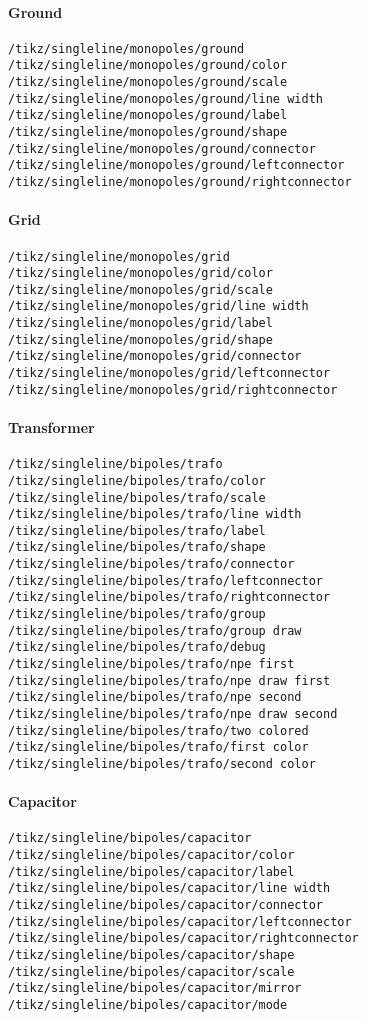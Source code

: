 \documentclass[a4]{article}
\begin{document}
\begin{footnotesize}
\paragraph{Ground}
\begin{verbatim}
/tikz/singleline/monopoles/ground
/tikz/singleline/monopoles/ground/color
/tikz/singleline/monopoles/ground/scale
/tikz/singleline/monopoles/ground/line width
/tikz/singleline/monopoles/ground/label
/tikz/singleline/monopoles/ground/shape
/tikz/singleline/monopoles/ground/connector
/tikz/singleline/monopoles/ground/leftconnector
/tikz/singleline/monopoles/ground/rightconnector
\end{verbatim}
\paragraph{Grid}
\begin{verbatim}
/tikz/singleline/monopoles/grid
/tikz/singleline/monopoles/grid/color
/tikz/singleline/monopoles/grid/scale
/tikz/singleline/monopoles/grid/line width
/tikz/singleline/monopoles/grid/label
/tikz/singleline/monopoles/grid/shape
/tikz/singleline/monopoles/grid/connector
/tikz/singleline/monopoles/grid/leftconnector
/tikz/singleline/monopoles/grid/rightconnector
\end{verbatim}
\paragraph{Transformer}
\begin{verbatim}
/tikz/singleline/bipoles/trafo
/tikz/singleline/bipoles/trafo/color
/tikz/singleline/bipoles/trafo/scale
/tikz/singleline/bipoles/trafo/line width
/tikz/singleline/bipoles/trafo/label
/tikz/singleline/bipoles/trafo/shape
/tikz/singleline/bipoles/trafo/connector
/tikz/singleline/bipoles/trafo/leftconnector
/tikz/singleline/bipoles/trafo/rightconnector
/tikz/singleline/bipoles/trafo/group
/tikz/singleline/bipoles/trafo/group draw
/tikz/singleline/bipoles/trafo/debug
/tikz/singleline/bipoles/trafo/npe first
/tikz/singleline/bipoles/trafo/npe draw first
/tikz/singleline/bipoles/trafo/npe second
/tikz/singleline/bipoles/trafo/npe draw second
/tikz/singleline/bipoles/trafo/two colored
/tikz/singleline/bipoles/trafo/first color
/tikz/singleline/bipoles/trafo/second color
\end{verbatim}
\paragraph{Capacitor}
\begin{verbatim}
/tikz/singleline/bipoles/capacitor
/tikz/singleline/bipoles/capacitor/color
/tikz/singleline/bipoles/capacitor/label
/tikz/singleline/bipoles/capacitor/line width
/tikz/singleline/bipoles/capacitor/connector
/tikz/singleline/bipoles/capacitor/leftconnector
/tikz/singleline/bipoles/capacitor/rightconnector
/tikz/singleline/bipoles/capacitor/shape
/tikz/singleline/bipoles/capacitor/scale
/tikz/singleline/bipoles/capacitor/mirror
/tikz/singleline/bipoles/capacitor/mode
\end{verbatim}

\end{footnotesize}
\end{document}
